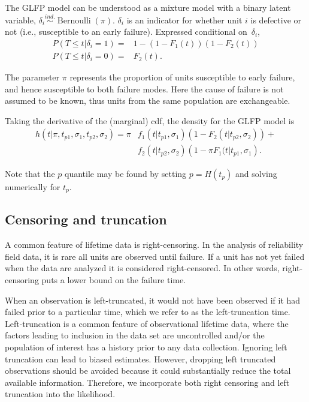 \documentclass[12pt]{article}
\newcommand{\ind}{\stackrel{ind.}{\sim}}
\newcommand{\op}{\operatorname}
\begin{document}
The GLFP model can be understood as a mixture model with a binary latent variable, $\delta_i\ind \op{Bernoulli}(\pi)$. $\delta_i$ is an indicator for whether unit $i$ is defective or not (i.e., susceptible to an early failure). Expressed conditional on~$\delta_i$,
\begin{align*}
P(T\le t | \delta_i=1) =& 1 -(1-F_1(t))(1-F_2(t))\\
P(T\le t | \delta_i=0) =& F_2(t).
\end{align*}

 
The parameter $\pi$ represents the proportion of units susceptible to early failure, and hence susceptible to both failure modes. Here the cause of failure is not assumed to be known, thus units from the same population are exchangeable.

Taking the derivative of the (marginal) cdf, the density for the GLFP model is
\begin{align*}
h(t|\pi, t_{p1},\sigma_1, t_{p2}, \sigma_2) = \pi & f_1(t|t_{p1},\sigma_1)\left(1-F_2(t|t_{p2},\sigma_2)\right) + \\ & f_2(t|t_{p2},\sigma_2)\left(1-\pi F_1(t|t_{p1},\sigma_1\right).
\end{align*}

Note that the $p$ quantile may be found by setting $p=H(t_p)$ and solving numerically for $t_p$.

\subsection{Censoring and truncation}
A common feature of lifetime data is right-censoring. In the analysis of reliability field data, it is rare all units are observed until failure. If a unit has not yet failed when the data are analyzed it is considered right-censored.  In other words, right-censoring puts a lower bound on the failure time.


When an observation is left-truncated, it would not have been observed if it had failed prior to a particular time, which we refer to as the left-truncation time.  Left-truncation is a common feature of observational lifetime data, where the factors leading to inclusion in the data set are uncontrolled and/or the population of interest has a history prior to any data collection. Ignoring left truncation can lead to biased estimates. However, dropping left truncated observations should be avoided because it could substantially reduce the total available information.  Therefore, we incorporate both right censoring and left truncation into the likelihood. 
\end{document}
